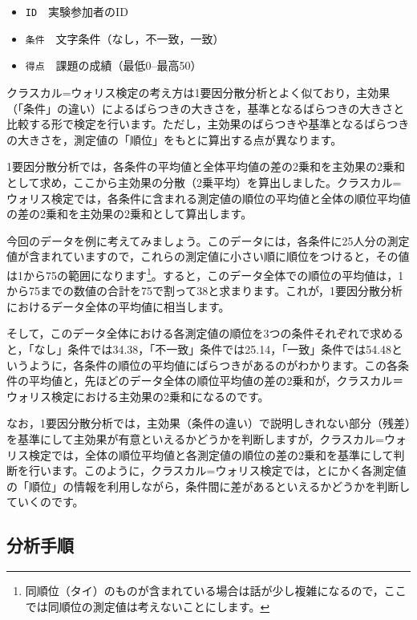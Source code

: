 \documentclass[
  12pt,
  a5jpaper,
  lualatex, ja=standard]{bxjsbook}
\providecommand{\tightlist}{%
  \setlength{\itemsep}{0pt}\setlength{\parskip}{0pt}}
\newenvironment{jmvvar}{%
	\begin{center}%
	\begin{tcolorbox}[%
		title=変数一覧,
		colframe=daidai,
		colbacktitle=daidai!30!white,
		coltitle=daidai!10!black,
		colback=daidai!2!white,
		breakable,
		width=.9\textwidth
		]\small\addtolength{\leftmargini}{-3\labelsep}%
	}%
	{\end{tcolorbox}\end{center}}
\begin{document}
\begin{jmvvar}

\begin{itemize}
\tightlist
\item
  \texttt{ID}　実験参加者のID
\item
  \texttt{条件}　文字条件（なし，不一致，一致）
\item
  \texttt{得点}　課題の成績（最低0--最高50）
\end{itemize}

\end{jmvvar}

クラスカル=ウォリス検定の考え方は1要因分散分析とよく似ており，主効果（「条件」の違い）によるばらつきの大きさを，基準となるばらつきの大きさと比較する形で検定を行います。ただし，主効果のばらつきや基準となるばらつきの大きさを，測定値の「順位」をもとに算出する点が異なります。

1要因分散分析では，各条件の平均値と全体平均値の差の2乗和を主効果の2乗和として求め，ここから主効果の分散（2乗平均）を算出しました。クラスカル=ウォリス検定では，各条件に含まれる測定値の順位の平均値と全体の順位平均値の差の2乗和を主効果の2乗和として算出します。

今回のデータを例に考えてみましょう。このデータには，各条件に25人分の測定値が含まれていますので，これらの測定値に小さい順に順位をつけると，その値は1から75の範囲になります\footnote{同順位（タイ）のものが含まれている場合は話が少し複雑になるので，ここでは同順位の測定値は考えないことにします。}。すると，このデータ全体での順位の平均値は，1から75までの数値の合計を75で割って38と求まります。これが，1要因分散分析におけるデータ全体の平均値に相当します。

そして，このデータ全体における各測定値の順位を3つの条件それぞれで求めると，「なし」条件では34.38，「不一致」条件では25.14，「一致」条件では54.48というように，各条件の順位の平均値にばらつきがあるのがわかります。この各条件の平均値と，先ほどのデータ全体の順位平均値の差の2乗和が，クラスカル＝ウォリス検定における主効果の2乗和になるのです。

なお，1要因分散分析では，主効果（条件の違い）で説明しきれない部分（残差）を基準にして主効果が有意といえるかどうかを判断しますが，クラスカル=ウォリス検定では，全体の順位平均値と各測定値の順位の差の2乗和を基準にして判断を行います。このように，クラスカル=ウォリス検定では，とにかく各測定値の「順位」の情報を利用しながら，条件間に差があるといえるかどうかを判断していくのです。

\hypertarget{sub:ANOVA-kw-procedure}{%
\subsection{分析手順}\label{sub:ANOVA-kw-procedure}}
\end{document}
